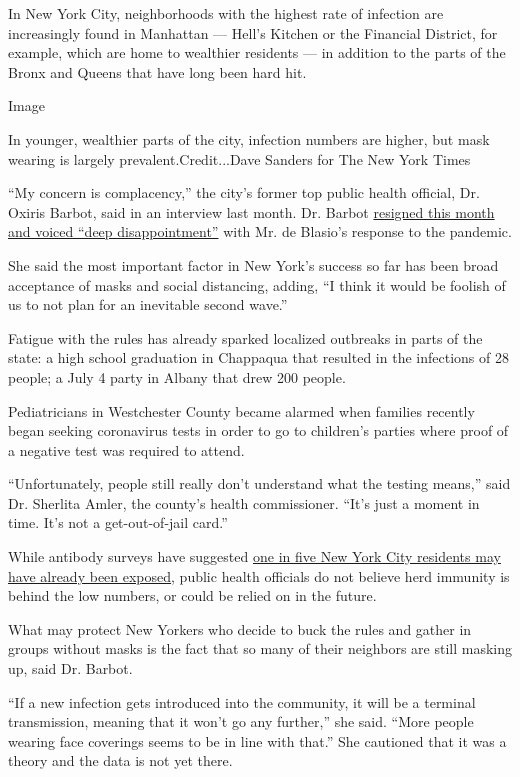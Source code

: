 In New York City, neighborhoods with the highest rate of infection are
increasingly found in Manhattan --- Hell's Kitchen or the Financial
District, for example, which are home to wealthier residents --- in
addition to the parts of the Bronx and Queens that have long been hard
hit.

Image

In younger, wealthier parts of the city, infection numbers are higher,
but mask wearing is largely prevalent.Credit...Dave Sanders for The New
York Times

``My concern is complacency,'' the city's former top public health
official, Dr. Oxiris Barbot, said in an interview last month. Dr. Barbot
\href{https://www.nytimes3xbfgragh.onion/2020/08/04/nyregion/oxiris-barbot-health-commissioner-resigns.html}{resigned
this month and voiced ``deep disappointment''} with Mr. de Blasio's
response to the pandemic.

She said the most important factor in New York's success so far has been
broad acceptance of masks and social distancing, adding, ``I think it
would be foolish of us to not plan for an inevitable second wave.''

Fatigue with the rules has already sparked localized outbreaks in parts
of the state: a high school graduation in Chappaqua that resulted in the
infections of 28 people; a July 4 party in Albany that drew 200 people.

Pediatricians in Westchester County became alarmed when families
recently began seeking coronavirus tests in order to go to children's
parties where proof of a negative test was required to attend.

``Unfortunately, people still really don't understand what the testing
means,'' said Dr. Sherlita Amler, the county's health commissioner.
``It's just a moment in time. It's not a get-out-of-jail card.''

While antibody surveys have suggested
\href{https://www.nytimes3xbfgragh.onion/2020/04/23/nyregion/coronavirus-antibodies-test-ny.html}{one
in five New York City residents may have already been exposed}, public
health officials do not believe herd immunity is behind the low numbers,
or could be relied on in the future.

What may protect New Yorkers who decide to buck the rules and gather in
groups without masks is the fact that so many of their neighbors are
still masking up, said Dr. Barbot.

``If a new infection gets introduced into the community, it will be a
terminal transmission, meaning that it won't go any further,'' she said.
``More people wearing face coverings seems to be in line with that.''
She cautioned that it was a theory and the data is not yet there.

